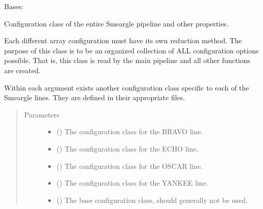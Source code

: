 \documentclass[letterpaper,10pt,english]{sphinxmanual}
\begin{document}
\begin{fulllineitems}
\label{\detokenize{python_docstrings/IfA_Smeargle.yankee.yankee_main:IfA_Smeargle.yankee.yankee_main.SmeargleConfig}}
Bases: {\hyperref[\detokenize{python_docstrings/IfA_Smeargle.yankee.configuration_classes.BaseConfig_file:IfA_Smeargle.yankee.configuration_classes.BaseConfig_file.BaseConfig}]{}}

Configuration class of the entire Smeargle pipeline and other
properties.

Each different array configuration must have its own reduction method.
The purpose of this class is to be an organized collection of ALL
configuration options possible. That is, this class is read by the main
pipeline and all other functions are created.

Within each argument exists another configuration class specific to each
of the Smeargle lines. They are defined in their appropriate files.
\begin{quote}\begin{description}
\item[{Parameters}] \leavevmode\begin{itemize}
\item {} 
 () \textendash{} The configuration class for the BRAVO line.

\item {} 
 () \textendash{} The configuration class for the ECHO line.

\item {} 
 () \textendash{} The configuration class for the OSCAR line.

\item {} 
 () \textendash{} The configuration class for the YANKEE line.

\item {} 
 () \textendash{} The base configuration class, should generally not be used.

\end{itemize}

\end{description}\end{quote}

\end{fulllineitems}
\end{document}
